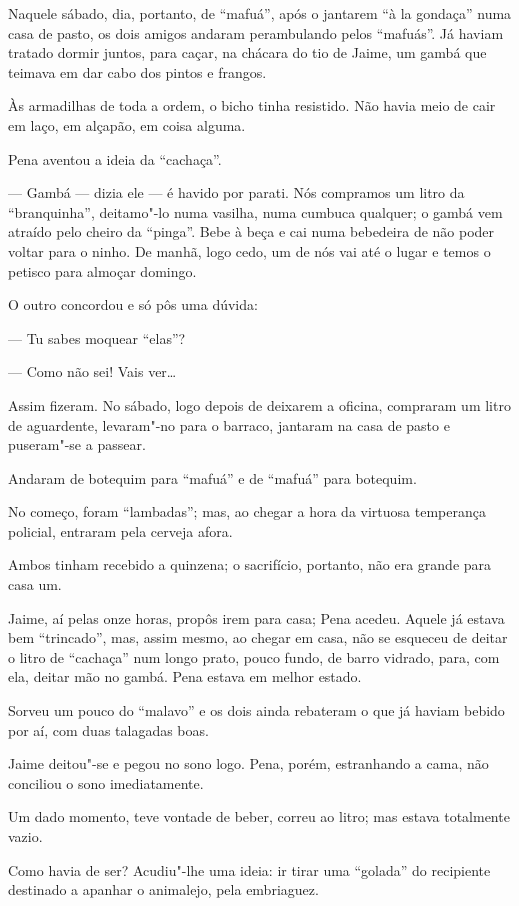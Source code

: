 Naquele sábado, dia, portanto, de ``mafuá'', após o jantarem ``à la
gondaça'' numa casa de pasto, os dois amigos andaram perambulando pelos
``mafuás''. Já haviam tratado dormir juntos, para caçar, na chácara do
tio de Jaime, um gambá que teimava em dar cabo dos pintos e frangos.

Às armadilhas de toda a ordem, o bicho tinha resistido. Não havia meio
de cair em laço, em alçapão, em coisa alguma.

Pena aventou a ideia da ``cachaça''.

--- Gambá --- dizia ele --- é havido por parati. Nós compramos um litro da
``branquinha'', deitamo"-lo numa vasilha, numa cumbuca qualquer; o gambá
vem atraído pelo cheiro da ``pinga''. Bebe à beça e cai numa bebedeira
de não poder voltar para o ninho. De manhã, logo cedo, um de nós vai até
o lugar e temos o petisco para almoçar domingo.

O outro concordou e só pôs uma dúvida:

--- Tu sabes moquear ``elas''?

--- Como não sei! Vais ver\ldots{}

Assim fizeram. No sábado, logo depois de deixarem a oficina, compraram
um litro de aguardente, levaram"-no para o barraco, jantaram na casa de
pasto e puseram"-se a passear.

Andaram de botequim para ``mafuá'' e de ``mafuá'' para botequim.

No começo, foram ``lambadas''; mas, ao chegar a hora da virtuosa
temperança policial, entraram pela cerveja afora.

Ambos tinham recebido a quinzena; o sacrifício, portanto, não era grande
para casa um.

Jaime, aí pelas onze horas, propôs irem para casa; Pena acedeu. Aquele
já estava bem ``trincado'', mas, assim mesmo, ao chegar em casa, não se
esqueceu de deitar o litro de ``cachaça'' num longo prato, pouco fundo,
de barro vidrado, para, com ela, deitar mão no gambá. Pena estava em
melhor estado.

Sorveu um pouco do ``malavo'' e os dois ainda rebateram o que já haviam
bebido por aí, com duas talagadas boas.

Jaime deitou"-se e pegou no sono logo. Pena, porém, estranhando a cama,
não conciliou o sono imediatamente.

Um dado momento, teve vontade de beber, correu ao litro; mas estava
totalmente vazio.

Como havia de ser? Acudiu"-lhe uma ideia: ir tirar uma ``golada'' do
recipiente destinado a apanhar o animalejo, pela embriaguez.

